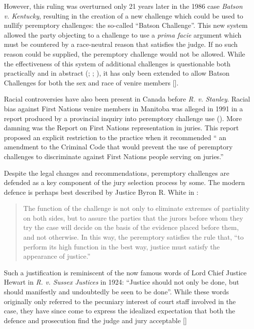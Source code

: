 However, this ruling was overturned only 21 years later in the 1986 case \textit{Batson v. Kentucky}, resulting in the creation of a new challenge which
could be used to nullify peremptory challenges: the so-called ``Batson Challenge''. This new system allowed the
party objecting to a challenge to use a \textit{prima facie} argument which must be countered by a race-neutral reason that
satisfies the judge. If no such reason could be supplied, the peremptory challenge would not be allowed. While the
effectiveness of this system of additional challenges is questionable both practically and in abstract (\cite{page2005};
\cite{morehead1994}; \cite{hoffman1997}), it has only been extended to allow Batson
Challenges for both the sex and race of venire members [\cite{jebvalabama}].

Racial controversies have also been present in Canada before \textit{R. v. Stanley}. Racial bias against First Nations
venire members in Manitoba was alleged in 1991 in a report produced by a provincial inquiry into peremptory challenge use (\cite{goodfirststep}). More damning was the \citeauthor{iacobuccireport} Report on First Nations representation in
juries. This report proposed an explicit restriction to the practice when it recommended `` an amendment to the Criminal Code that would prevent the use of peremptory challenges to discriminate against First Nations people serving on juries.''

Despite the legal changes and recommendations, peremptory challenges are
defended as a key component of the jury selection process by some. The modern defence is perhaps best described by Justice Byron
R. White in \cite{swainvalabama}:

\begin{quote}
The function of the challenge is not only to eliminate extremes of partiality on both sides, but to assure the parties that the
jurors before whom they try the case will decide on the basis of the evidence placed before them, and not otherwise. In this way,
the peremptory satisfies the rule that, ``to perform its high function in the best way, justice must satisfy the appearance of
justice.''
\end{quote}

Such a justification is reminiscent of the now famous words of Lord Chief Justice Hewart in \textit{R. v. Sussex Justices} in 1924:
``Justice should not only be done, but should manifestly and undoubtedly be seen to be done''. While these words originally only referred to the pecuniary interest of court staff involved in the case, they
have since come to express the idealized expectation that both the defence and prosecution find the judge and jury acceptable [\cite{oakes2016}]

